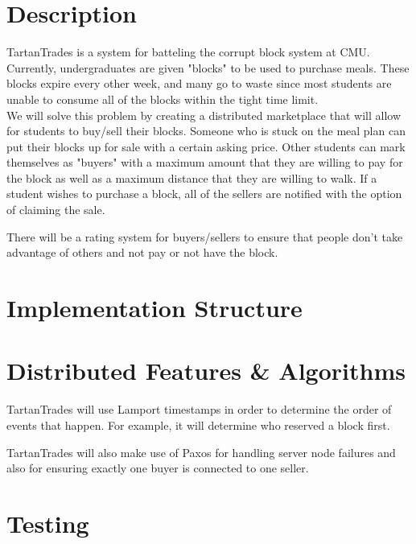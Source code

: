 \documentclass[12pt]{article}
\begin{document}
\maketitle

\section{Description}

TartanTrades is a system for batteling the corrupt block system at CMU\@.  Currently, undergraduates are given "blocks" to be used to purchase meals.
These blocks expire every other week, and many go to waste since most students are unable to consume all of the blocks within the tight time limit.\\

We will solve this problem by creating a distributed marketplace that will allow for students to buy/sell their blocks.  Someone who is stuck on the meal
plan can put their blocks up for sale with a certain asking price.  Other students can mark themselves as "buyers" with a maximum amount that they are willing
to pay for the block as well as a maximum distance that they are willing to walk.  If a student wishes to purchase a block, all of the sellers are notified with
the option of claiming the sale.

There will be a rating system for buyers/sellers to ensure that people don't take advantage of others and not pay or not have the block.


\section{Implementation Structure}


\section{Distributed Features \& Algorithms}

TartanTrades will use Lamport timestamps in order to determine the order of events that happen.  For example, it will determine who reserved a block first.

TartanTrades will also make use of Paxos for handling server node failures and also for ensuring exactly one buyer is connected to one seller.

\section{Testing}
\end{document}
